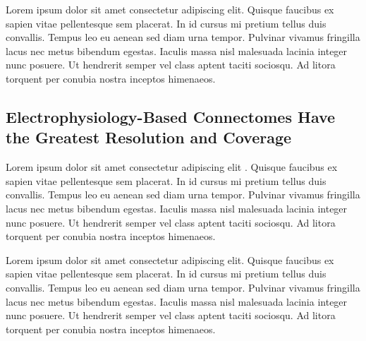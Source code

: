 \documentclass[11pt]{article}
\newcommand{\subsectionwithindent}[1]{
    \subsection*{#1}
    \hspace{\parindent} %
}
\begin{document}
Lorem ipsum dolor sit amet consectetur adipiscing elit. Quisque faucibus ex sapien vitae pellentesque sem placerat. In id cursus mi pretium tellus duis convallis. Tempus leo eu aenean sed diam urna tempor. Pulvinar vivamus fringilla lacus nec metus bibendum egestas. Iaculis massa nisl malesuada lacinia integer nunc posuere. Ut hendrerit semper vel class aptent taciti sociosqu. Ad litora torquent per conubia nostra inceptos himenaeos.

\subsectionwithindent{Electrophysiology-Based Connectomes Have the Greatest Resolution and Coverage}
Lorem ipsum dolor sit amet consectetur adipiscing elit \cite{white1986structure, emmons2015connectomics}. Quisque faucibus ex sapien vitae pellentesque sem placerat. In id cursus mi pretium tellus duis convallis. Tempus leo eu aenean sed diam urna tempor. Pulvinar vivamus fringilla lacus nec metus bibendum egestas. Iaculis massa nisl malesuada lacinia integer nunc posuere. Ut hendrerit semper vel class aptent taciti sociosqu. Ad litora torquent per conubia nostra inceptos himenaeos.

Lorem ipsum dolor sit amet consectetur adipiscing elit. Quisque faucibus ex sapien vitae pellentesque sem placerat. In id cursus mi pretium tellus duis convallis. Tempus leo eu aenean sed diam urna tempor. Pulvinar vivamus fringilla lacus nec metus bibendum egestas. Iaculis massa nisl malesuada lacinia integer nunc posuere. Ut hendrerit semper vel class aptent taciti sociosqu. Ad litora torquent per conubia nostra inceptos himenaeos.
\end{document}

